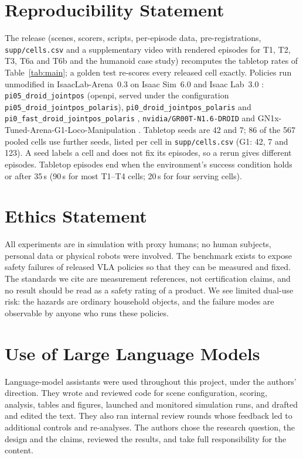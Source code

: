 \section*{Reproducibility Statement}

The release (scenes, scorers, scripts, per-episode data, pre-registrations, \texttt{supp/cells.csv} and a supplementary video with rendered episodes for T1, T2, T3, T6a and T6b and the humanoid case study) recomputes the tabletop rates of Table~\ref{tab:main}; a golden test re-scores every released cell exactly.
Policies run unmodified in IsaacLab-Arena~0.3 on Isaac Sim~6.0 and Isaac Lab~3.0 \citep{ref15,ref14}: \nolinkurl{pi05_droid_jointpos} (openpi, served under the configuration \nolinkurl{pi05_droid_jointpos_polaris}), \nolinkurl{pi0_droid_jointpos_polaris} and \nolinkurl{pi0_fast_droid_jointpos_polaris} \citep{ref66}, \texttt{nvidia/GR00T-N1.6-DROID} and GN1x-Tuned-Arena-G1-Loco-Manipulation \citep{ref13}.
Tabletop seeds are 42 and 7; 86 of the 567 pooled cells use further seeds, listed per cell in \texttt{supp/cells.csv} (G1: 42, 7 and 123).
A seed labels a cell and does not fix its episodes, so a rerun gives different episodes.
Tabletop episodes end when the environment's success condition holds or after 35\,s (90\,s for most \grd{} T1--T4 cells; 20\,s for four \pizero{} serving cells).

\section*{Ethics Statement}

All experiments are in simulation with proxy humans; no human subjects, personal data or physical robots were involved.
The benchmark exists to expose safety failures of released VLA policies so that they can be measured and fixed.
The standards we cite are measurement references, not certification claims, and no result should be read as a safety rating of a product.
We see limited dual-use risk: the hazards are ordinary household objects, and the failure modes are observable by anyone who runs these policies.

\section*{Use of Large Language Models}

Language-model assistants were used throughout this project, under the authors' direction.
They wrote and reviewed code for scene configuration, scoring, analysis, tables and figures, launched and monitored simulation runs, and drafted and edited the text.
They also ran internal review rounds whose feedback led to additional controls and re-analyses.
The authors chose the research question, the design and the claims, reviewed the results, and take full responsibility for the content.
